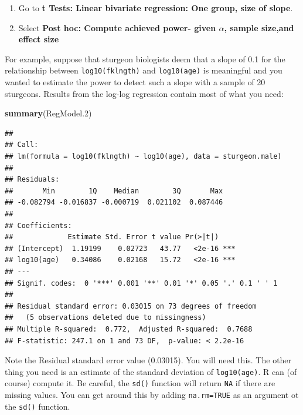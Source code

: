 \documentclass[
  12pt,
]{book}
\newenvironment{Shaded}{\begin{snugshade}}{\end{snugshade}}
\newcommand{\DataTypeTok}[1]{\textcolor[rgb]{0.13,0.29,0.53}{#1}}
\newcommand{\FloatTok}[1]{\textcolor[rgb]{0.00,0.00,0.81}{#1}}
\newcommand{\KeywordTok}[1]{\textcolor[rgb]{0.13,0.29,0.53}{\textbf{#1}}}
\newcommand{\NormalTok}[1]{#1}
\newcommand{\OperatorTok}[1]{\textcolor[rgb]{0.81,0.36,0.00}{\textbf{#1}}}
\newcommand{\OtherTok}[1]{\textcolor[rgb]{0.56,0.35,0.01}{#1}}
\providecommand{\tightlist}{%
  \setlength{\itemsep}{0pt}\setlength{\parskip}{0pt}}
\begin{document}
\begin{enumerate}
\def\labelenumi{\arabic{enumi}.}
\tightlist
\item
  Go to \textbf{t Tests: Linear bivariate regression: One group, size of slope}.
\item
  Select \textbf{Post hoc: Compute achieved power- given \(\alpha\), sample size,and effect size}
\end{enumerate}

For example, suppose that sturgeon biologists deem that a slope of 0.1 for the relationship between \texttt{log10(fklngth)} and \texttt{log10(age)} is meaningful and you wanted to estimate the power to detect such a slope with a sample of 20 sturgeons. Results from the log-log regression contain most of what you need:

\begin{Shaded}
\begin{Highlighting}[]
\KeywordTok{summary}\NormalTok{(RegModel}\FloatTok{.2}\NormalTok{)}
\end{Highlighting}
\end{Shaded}

\begin{verbatim}
## 
## Call:
## lm(formula = log10(fklngth) ~ log10(age), data = sturgeon.male)
## 
## Residuals:
##       Min        1Q    Median        3Q       Max 
## -0.082794 -0.016837 -0.000719  0.021102  0.087446 
## 
## Coefficients:
##             Estimate Std. Error t value Pr(>|t|)    
## (Intercept)  1.19199    0.02723   43.77   <2e-16 ***
## log10(age)   0.34086    0.02168   15.72   <2e-16 ***
## ---
## Signif. codes:  0 '***' 0.001 '**' 0.01 '*' 0.05 '.' 0.1 ' ' 1
## 
## Residual standard error: 0.03015 on 73 degrees of freedom
##   (5 observations deleted due to missingness)
## Multiple R-squared:  0.772,  Adjusted R-squared:  0.7688 
## F-statistic: 247.1 on 1 and 73 DF,  p-value: < 2.2e-16
\end{verbatim}

Note the Residual standard error value (0.03015). You will need this.
The other thing you need is an estimate of the standard deviation of \texttt{log10(age)}.
R can (of course) compute it. Be careful, the \texttt{sd()} function will return \texttt{NA} if there are missing values. You can get around this by adding \texttt{na.rm=TRUE} as an argument ot the \texttt{sd()} function.

\begin{Shaded}
\end{Shaded}
\end{document}
